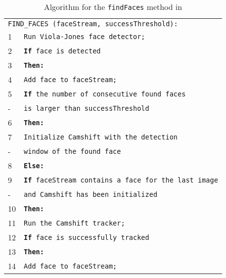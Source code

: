 \begin{table}[ht]
\caption{Algorithm for the \texttt{findFaces} method in \FaceTracker{}}
\begin{center}
\begin{tabular}{ l l }
\hline
\multicolumn{2}{l}{\texttt{FIND\_FACES (faceStream, successThreshold):}} \\
1 & \texttt{Run Viola-Jones face detector;} \\
2 & \texttt{{\bf If} face is detected} \\
3 & \hspace{0.6cm} \texttt{\bf Then:} \\
4 & \hspace{1.2cm} \texttt{Add face to faceStream;} \\
5 & \hspace{1.2cm} \texttt{{\bf If} the number of consecutive found faces} \\
- & \hspace{1.2cm} \texttt{is larger than successThreshold} \\
6 & \hspace{1.8cm} \texttt{\bf Then:} \\
7 & \hspace{2.4cm} \texttt{Initialize Camshift with the detection} \\
- & \hspace{2.4cm} \texttt{window of the found face} \\
8 & \hspace{0.6cm} \texttt{\bf Else:} \\
9 & \hspace{1.2cm} \texttt{{\bf If} faceStream contains a face for the last image} \\
- & \hspace{1.2cm} \texttt{and Camshift has been initialized} \\
10 & \hspace{1.8cm} \texttt{\bf Then:} \\
11 & \hspace{2.4cm} \texttt{Run the Camshift tracker;} \\
12 & \hspace{2.4cm} \texttt{{\bf If} face is successfully tracked} \\
13 & \hspace{3.0cm} \texttt{\bf Then:} \\
14 & \hspace{3.6cm} \texttt{Add face to faceStream;} \\
\hline
\end{tabular}
\end{center}
\label{facetrackeralgorithm}
\end{table}

